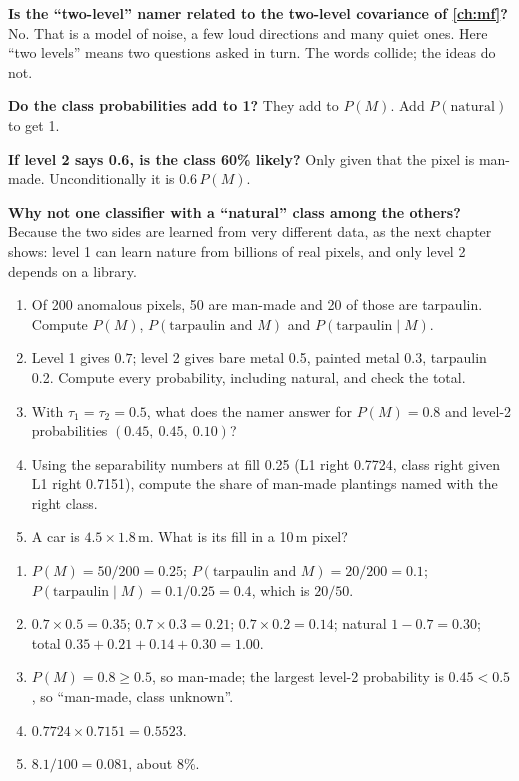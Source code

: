 \documentclass[11pt,a4paper,oneside,openany]{book}
\begin{document}
\begin{confusions}
\textbf{Is the ``two-level'' namer related to the two-level covariance of \cref{ch:mf}?} No. That is a model of noise, a few loud directions and many quiet ones. Here
``two levels'' means two questions asked in turn. The words collide; the ideas do not.

\textbf{Do the class probabilities add to 1?} They add to $P(M)$. Add $P(\text{natural})$ to get 1.

\textbf{If level 2 says 0.6, is the class 60\% likely?} Only given that the pixel is man-made. Unconditionally it is $0.6\,P(M)$.

\textbf{Why not one classifier with a ``natural'' class among the others?} Because the two sides are learned from very different data, as the next chapter shows: level 1
can learn nature from billions of real pixels, and only level 2 depends on a library.
\end{confusions}

\begin{checkyourself}
\begin{enumerate}
\item Of 200 anomalous pixels, 50 are man-made and 20 of those are tarpaulin. Compute $P(M)$, $P(\text{tarpaulin and }M)$ and $P(\text{tarpaulin}\mid M)$.
\item Level 1 gives $0.7$; level 2 gives bare metal 0.5, painted metal 0.3, tarpaulin 0.2. Compute every probability, including natural, and check the total.
\item With $\tau_1=\tau_2=0.5$, what does the namer answer for $P(M)=0.8$ and level-2 probabilities $(0.45,\ 0.45,\ 0.10)$?
\item Using the separability numbers at fill 0.25 (L1 right 0.7724, class right given L1 right 0.7151), compute the share of man-made plantings named with the right class.
\item A car is $4.5\times1.8$\,m. What is its fill in a 10\,m pixel?
\end{enumerate}
\end{checkyourself}

\begin{answers}
\begin{enumerate}
\item $P(M)=50/200=0.25$; $P(\text{tarpaulin and }M)=20/200=0.1$; $P(\text{tarpaulin}\mid M)=0.1/0.25=0.4$, which is $20/50$.
\item $0.7\times0.5=0.35$; $0.7\times0.3=0.21$; $0.7\times0.2=0.14$; natural $1-0.7=0.30$; total $0.35+0.21+0.14+0.30=1.00$.
\item $P(M)=0.8\ge0.5$, so man-made; the largest level-2 probability is $0.45<0.5$, so ``man-made, class unknown''.
\item $0.7724\times0.7151=0.5523$.
\item $8.1/100=0.081$, about 8\%.
\end{enumerate}
\end{answers}
\end{document}
